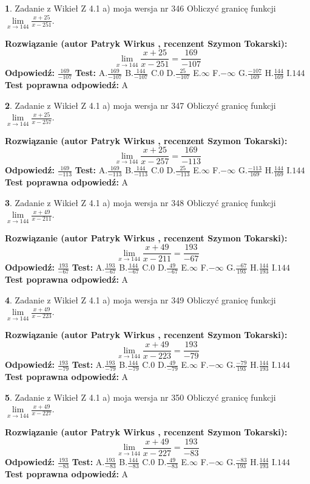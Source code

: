 \documentclass[12pt, a4paper]{article}
\theoremstyle{definition} %
\newtheorem{zad}{}
\newcommand{\zadStart}[1]{\begin{zad}#1\newline}
\newcommand{\zadStop}{\end{zad}}
\newcommand{\rozwStart}[2]{\noindent \textbf{Rozwiązanie (autor #1 , recenzent #2): }\newline}
\newcommand{\rozwStop}{\newline}
\newcommand{\odpStart}{\noindent \textbf{Odpowiedź:}\newline}
\newcommand{\odpStop}{\newline}
\newcommand{\testStart}{\noindent \textbf{Test:}\newline}
\newcommand{\testStop}{\newline}
\newcommand{\kluczStart}{\noindent \textbf{Test poprawna odpowiedź:}\newline}
\newcommand{\kluczStop}{\newline}
\begin{document}
\zadStart{Zadanie z Wikieł Z 4.1 a) moja wersja nr 346}
Obliczyć granicę funkcji $\lim\limits_{x\to144}\frac{x+25}{x-251}$.
\zadStop
\rozwStart{Patryk Wirkus}{Szymon Tokarski}
$$\lim\limits_{x\to144}\frac{x+25}{x-251} = \frac{169}{-107}$$
\rozwStop
\odpStart
$\frac{169}{-107}$
\odpStop
\testStart
A.$\frac{169}{-107}$
B.$\frac{144}{-107}$
C.$0$
D.$\frac{25}{-107}$
E.$\infty$
F.$-\infty$
G.$\frac{-107}{169}$
H.$\frac{144}{169}$
I.$144$
\testStop
\kluczStart
A
\kluczStop



\zadStart{Zadanie z Wikieł Z 4.1 a) moja wersja nr 347}
Obliczyć granicę funkcji $\lim\limits_{x\to144}\frac{x+25}{x-257}$.
\zadStop
\rozwStart{Patryk Wirkus}{Szymon Tokarski}
$$\lim\limits_{x\to144}\frac{x+25}{x-257} = \frac{169}{-113}$$
\rozwStop
\odpStart
$\frac{169}{-113}$
\odpStop
\testStart
A.$\frac{169}{-113}$
B.$\frac{144}{-113}$
C.$0$
D.$\frac{25}{-113}$
E.$\infty$
F.$-\infty$
G.$\frac{-113}{169}$
H.$\frac{144}{169}$
I.$144$
\testStop
\kluczStart
A
\kluczStop



\zadStart{Zadanie z Wikieł Z 4.1 a) moja wersja nr 348}
Obliczyć granicę funkcji $\lim\limits_{x\to144}\frac{x+49}{x-211}$.
\zadStop
\rozwStart{Patryk Wirkus}{Szymon Tokarski}
$$\lim\limits_{x\to144}\frac{x+49}{x-211} = \frac{193}{-67}$$
\rozwStop
\odpStart
$\frac{193}{-67}$
\odpStop
\testStart
A.$\frac{193}{-67}$
B.$\frac{144}{-67}$
C.$0$
D.$\frac{49}{-67}$
E.$\infty$
F.$-\infty$
G.$\frac{-67}{193}$
H.$\frac{144}{193}$
I.$144$
\testStop
\kluczStart
A
\kluczStop



\zadStart{Zadanie z Wikieł Z 4.1 a) moja wersja nr 349}
Obliczyć granicę funkcji $\lim\limits_{x\to144}\frac{x+49}{x-223}$.
\zadStop
\rozwStart{Patryk Wirkus}{Szymon Tokarski}
$$\lim\limits_{x\to144}\frac{x+49}{x-223} = \frac{193}{-79}$$
\rozwStop
\odpStart
$\frac{193}{-79}$
\odpStop
\testStart
A.$\frac{193}{-79}$
B.$\frac{144}{-79}$
C.$0$
D.$\frac{49}{-79}$
E.$\infty$
F.$-\infty$
G.$\frac{-79}{193}$
H.$\frac{144}{193}$
I.$144$
\testStop
\kluczStart
A
\kluczStop



\zadStart{Zadanie z Wikieł Z 4.1 a) moja wersja nr 350}
Obliczyć granicę funkcji $\lim\limits_{x\to144}\frac{x+49}{x-227}$.
\zadStop
\rozwStart{Patryk Wirkus}{Szymon Tokarski}
$$\lim\limits_{x\to144}\frac{x+49}{x-227} = \frac{193}{-83}$$
\rozwStop
\odpStart
$\frac{193}{-83}$
\odpStop
\testStart
A.$\frac{193}{-83}$
B.$\frac{144}{-83}$
C.$0$
D.$\frac{49}{-83}$
E.$\infty$
F.$-\infty$
G.$\frac{-83}{193}$
H.$\frac{144}{193}$
I.$144$
\testStop
\kluczStart
A
\kluczStop
\end{document}
